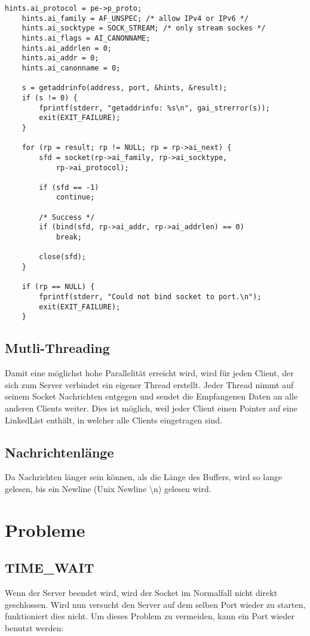 \documentclass[a4paper]{article}
\begin{document}
\begin{verbatim}
hints.ai_protocol = pe->p_proto;
    hints.ai_family = AF_UNSPEC; /* allow IPv4 or IPv6 */
    hints.ai_socktype = SOCK_STREAM; /* only stream sockes */
    hints.ai_flags = AI_CANONNAME;
    hints.ai_addrlen = 0;
    hints.ai_addr = 0;
    hints.ai_canonname = 0;

    s = getaddrinfo(address, port, &hints, &result);
    if (s != 0) {
        fprintf(stderr, "getaddrinfo: %s\n", gai_strerror(s));
        exit(EXIT_FAILURE);
    }

    for (rp = result; rp != NULL; rp = rp->ai_next) {
        sfd = socket(rp->ai_family, rp->ai_socktype,
            rp->ai_protocol);

        if (sfd == -1)
            continue;

        /* Success */
        if (bind(sfd, rp->ai_addr, rp->ai_addrlen) == 0)
            break;

        close(sfd);
    }

    if (rp == NULL) {
        fprintf(stderr, "Could not bind socket to port.\n");
        exit(EXIT_FAILURE);
    }
\end{verbatim}

\subsection{Mutli-Threading}
Damit eine möglichst hohe Parallelität erreicht wird, wird für jeden Client, der sich zum Server verbindet ein eigener Thread erstellt. Jeder Thread nimmt auf seinem Socket Nachrichten entgegen und sendet die Empfangenen Daten an alle anderen Clients weiter. Dies ist möglich, weil jeder Client einen Pointer auf eine LinkedList enthält, in welcher alle Clients eingetragen sind.

\subsection{Nachrichtenlänge}
Da Nachrichten länger sein können, als die Länge des Buffers, wird so lange gelesen, bis ein Newline (Unix Newline \textbackslash n) gelesen wird.

\section{Probleme}
\subsection{TIME\_WAIT}
Wenn der Server beendet wird, wird der Socket im Normalfall nicht direkt geschlossen. Wird nun versucht den Server auf dem selben Port wieder zu starten, funktioniert dies nicht. Um dieses Problem zu vermeiden, kann ein Port wieder benutzt werden:
\end{document}
